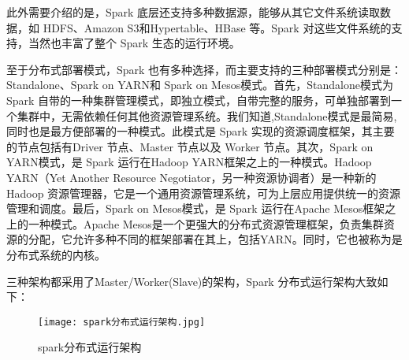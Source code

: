 此外需要介绍的是，Spark 底层还支持多种数据源，能够从其它文件系统读取数据，如 HDFS、Amazon S3和Hypertable、HBase 等。Spark 对这些文件系统的支持，当然也丰富了整个 Spark 生态的运行环境。


至于分布式部署模式，Spark 也有多种选择，而主要支持的三种部署模式分别是：Standalone、Spark on YARN和 Spark on Mesos模式。首先，Standalone模式为 Spark 自带的一种集群管理模式，即独立模式，自带完整的服务，可单独部署到一个集群中，无需依赖任何其他资源管理系统。我们知道,Standalone模式是最简易,同时也是最方便部署的一种模式。此模式是 Spark 实现的资源调度框架，其主要的节点包括有Driver 节点、Master 节点以及 Worker 节点。其次，Spark on YARN模式，是 Spark 运行在Hadoop YARN框架之上的一种模式。Hadoop YARN（Yet Another Resource Negotiator，另一种资源协调者）是一种新的 Hadoop 资源管理器，它是一个通用资源管理系统，可为上层应用提供统一的资源管理和调度。最后，Spark on Mesos模式，是 Spark 运行在Apache Mesos框架之上的一种模式。Apache Mesos是一个更强大的分布式资源管理框架，负责集群资源的分配，它允许多种不同的框架部署在其上，包括YARN。同时，它也被称为是分布式系统的内核。






三种架构都采用了Master/Worker(Slave)的架构，Spark 分布式运行架构大致如下：
\begin{figure}
    \centering
    \texttt{[image: spark分布式运行架构.jpg]}
    \caption{spark分布式运行架构}
    \label{fig:spark}
  \end{figure}

